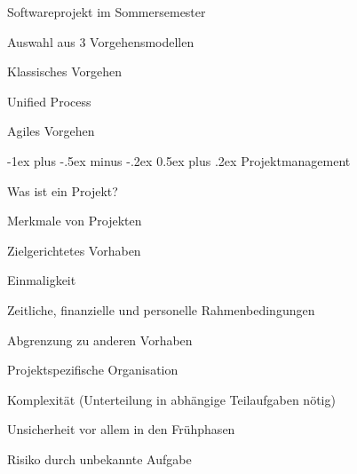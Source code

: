 \documentclass[a4paper]{article}
\makeatletter
\renewcommand{\section}{\@startsection{section}{1}{0mm}%
                                {-1ex plus -.5ex minus -.2ex}%
                                {0.5ex plus .2ex}%
                                {\normalfont\large\bfseries}}
\makeatother
\begin{document}
\begin{multicols}{3}
\begin{itemize*}
\begin{itemize*}
\begin{itemize*}
                  \end{itemize*}
          \end{itemize*}
    \item Softwareprojekt im Sommersemester
          \begin{itemize*}
            \item Auswahl aus 3 Vorgehensmodellen
                  \begin{itemize*}
                    \item Klassisches Vorgehen
                    \item Unified Process
                    \item Agiles Vorgehen
                  \end{itemize*}
          \end{itemize*}
  \end{itemize*}

  \section{Projektmanagement}

  Was ist ein Projekt?
  \begin{itemize*}
    \item Merkmale von Projekten
          \begin{itemize*}
            \item Zielgerichtetes Vorhaben
            \item Einmaligkeit
            \item Zeitliche, finanzielle und personelle Rahmenbedingungen
            \item Abgrenzung zu anderen Vorhaben
            \item Projektspezifische Organisation
            \item Komplexität (Unterteilung in abhängige Teilaufgaben nötig)
          \end{itemize*}
    \item Unsicherheit vor allem in den Frühphasen
    \item Risiko durch unbekannte Aufgabe
  \end{itemize*}


\end{multicols}
\end{document}
